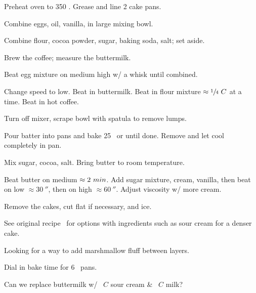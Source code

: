 \begin{preparation}
\item Preheat oven to 350 \Fahrenheit.
    Grease and line 2 cake pans.

\item Combine eggs, oil, vanilla, in large mixing bowl.

\item Combine flour, cocoa powder, sugar, baking soda, salt; set aside.

\item Brew the coffee; measure the buttermilk.

\item Beat egg mixture on medium high w/ a whisk until combined.

\item Change speed to low.
    Beat in buttermilk.
    Beat in flour mixture $\approx \onefourth~C$ at a time.
    Beat in hot coffee.

\item Turn off mixer, scrape bowl with spatula to remove lumps.

\item Pour batter into pans and bake 25 \minute~or until done.
    Remove and let cool completely in pan.

\item Mix sugar, cocoa, salt.
    Bring butter to room temperature.

\item Beat butter on medium $\approx2~\minute$.
    Add sugar mixture, cream, vanilla, then beat on low $\approx 30~\second$,
    then on high $\approx 60~\second$.
    Adjust viscosity w/ more cream.

\item Remove the cakes, cut flat if necessary, and ice.
\end{preparation}

\begin{variation}
\item See original recipe~\cite{sallyTripleChoc2020} for options with
    ingredients such as sour cream for a denser cake.
\end{variation}

\begin{experiments}
\item Looking for a way to add marshmallow fluff between layers.

\item Dial in bake time for 6 \inch~pans.

\item Can we replace buttermilk w/ \threefourth~$C$ sour cream \& \onefourth~$C$ milk?
\end{experiments}

\recipeend%
